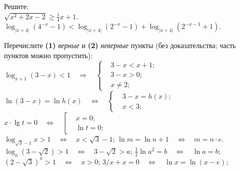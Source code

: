 %
%



\begin{problems}

\item
Решите:
\\
\sbp $\sqrt{x^2 + 2 x - 2} \geq \frac{1}{4} x + 1$.
\\[0.5ex]
\sbp
\(
    \log_{|x + 4|} (4^{-x} - 1)
    <
    \log_{|x + 4|} (2^{-x} - 1)
    +
    \log_{|x + 4|} (2^{-x - 1} + 1)
\).

\item
Перечислите \textbf{(1)} \emph{верные} и \textbf{(2)} \emph{неверные} пункты
(без доказательства; часть пунктов можно пропустить):
\\%
\sbp
\(
    \log_{x + 1} (3 - x) < 1
\quad\Rightarrow\quad
    \left\{\begin{aligned}
        & 3 - x < x + 1 ; \\
        & 3 - x > 0 ; \\
        & x \neq 2 ;
    \end{aligned}\right.
\)
\\[1ex]%
\sbp
\(
    \ln (3 - x) = \ln h(x)
\quad\Leftrightarrow\quad
    \left\{\begin{aligned}
        & 3 - x = h(x) ; \\
        & x < 3 ;
    \end{aligned}\right.
\)
\\[1ex]%
\sbp
\(
    x \cdot \lg t = 0
\quad\Leftrightarrow\quad
    \left[\begin{aligned}
        & x = 0 ; \\
        & \ln t = 0 ;
    \end{aligned}\right.
\)
\\[0.5ex] %
\sbp $\log_{\sqrt{3} - 1} x > 1 \quad\Leftrightarrow\quad x < \sqrt{3} - 1$;
\qquad %
\sbp $\ln m = \ln n + 1 \quad\Leftrightarrow\quad m = n \cdot e$.
\\[0.5ex] %
\sbp $\log_a (3 - \sqrt{2}) > 1 \quad\Leftrightarrow\quad 3 - \sqrt{2} > a$;
\qquad %
\sbp $\frac{1}{2} \ln a^2 = b \quad\Leftrightarrow\quad \ln a = b$;
\\[0.5ex] %
\sbp $(2 - \sqrt{3})^x > 1 \quad\Leftrightarrow\quad x > 0$;
\qquad %
\sbp $3/x + x = 0 \quad\Leftrightarrow\quad \ln x = \ln (x - e)$;

\end{problems}


